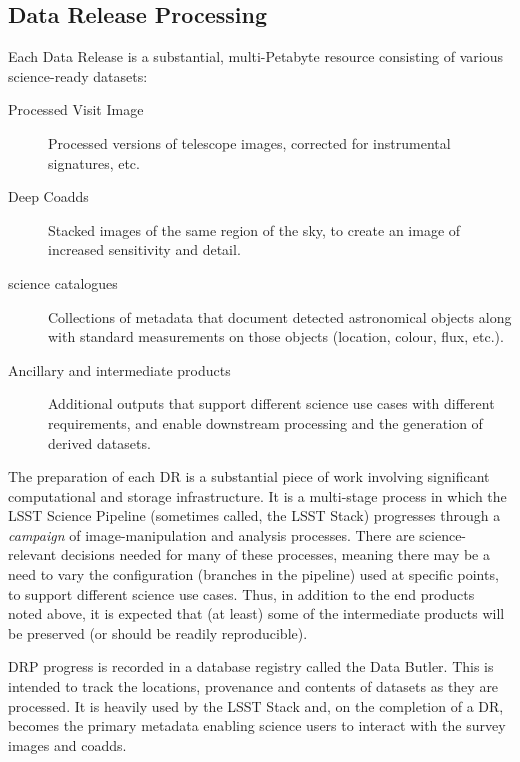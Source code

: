 \subsection{Data Release Processing}

Each Data Release is a substantial, multi-Petabyte resource consisting of various science-ready datasets:

\begin{description}

\item[Processed Visit Image] Processed versions of telescope images,
  corrected for instrumental signatures, etc.

\item[Deep Coadds] Stacked images of the same region of the sky, to
  create an image of increased sensitivity and detail.

\item[science catalogues] Collections of metadata that document
  detected astronomical objects along with standard measurements on
  those objects (location, colour, flux, etc.).

\item[Ancillary and intermediate products] Additional outputs that
  support different science use cases with different requirements, and
  enable downstream processing and the generation of derived datasets.

\end{description}

The preparation of each DR is a substantial piece of work involving
significant computational and storage infrastructure. It is a
multi-stage process in which the LSST Science Pipeline (sometimes
called, the LSST Stack) progresses through a {\em campaign} of
image-manipulation and analysis processes. There are science-relevant
decisions needed for many of these processes, meaning there may be a
need to vary the configuration (branches in the pipeline) used at
specific points, to support different science use cases. Thus, in
addition to the end products noted above, it is expected that (at
least) some of the intermediate products will be preserved (or should
be readily reproducible).

DRP progress is recorded in a database registry called the Data
Butler. This is intended to track the locations, provenance and
contents of datasets as they are processed. It is heavily used by the
LSST Stack and, on the completion of a DR, becomes the primary
metadata enabling science users to interact with the survey images and
coadds.

